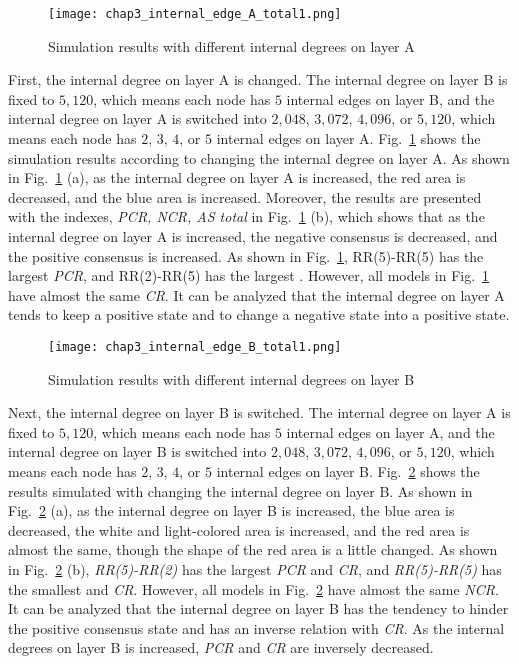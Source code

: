 \begin{figure}[!htb]
	\centering
	\texttt{[image: chap3\_internal\_edge\_A\_total1.png]}
	\caption{Simulation results with different internal degrees on layer A}
	\label{chap3_internal_edge_A_total}
\end{figure}

First, the internal degree on layer A is changed. The internal degree on layer B is fixed to $5,120$, which means each node has $5$ internal edges on layer B, and the internal degree on layer A is switched into $2,048$, $3,072$, $4,096$, or $5,120$, which means each node has $2$, $3$, $4$, or $5$ internal edges on layer A. Fig.~\ref{chap3_internal_edge_A_total} shows the simulation results according to changing the internal degree on layer A. As shown in Fig.~\ref{chap3_internal_edge_A_total} (a), as the internal degree on layer A is increased, the red area is decreased, and the blue area is increased. Moreover, the results are presented with the indexes, \textit{PCR, NCR, AS total} in Fig.~\ref{chap3_internal_edge_A_total} (b), which shows that as the internal degree on layer A is increased, the negative consensus is decreased, and the positive consensus is increased. As shown in Fig.~\ref{chap3_internal_edge_A_total}, RR(5)-RR(5) has the largest \textit{PCR}, and RR(2)-RR(5) has the largest . However, all models in Fig.~\ref{chap3_internal_edge_A_total} have almost the same \textit{CR}. It can be analyzed that the internal degree on layer A tends to keep a positive state and to change a negative state into a positive state. 

\begin{figure}[!htb]
	\centering
	\texttt{[image: chap3\_internal\_edge\_B\_total1.png]}
	\caption{Simulation results with different internal degrees on layer B}
	\label{chap3_internal_edge_B_total}
\end{figure}

Next, the internal degree on layer B is switched. The internal degree on layer A is fixed to  $5,120$, which means each node has $5$ internal edges on layer A, and the internal degree on layer B is switched into $2,048$, $3,072$, $4,096$, or $5,120$, which means each node has $2$, $3$, $4$, or $5$ internal edges on layer B. Fig.~\ref{chap3_internal_edge_B_total} shows the results simulated with changing the internal degree on layer B. As shown in Fig.~\ref{chap3_internal_edge_B_total} (a), as the internal degree on layer B is increased, the blue area is decreased, the white and light-colored area is increased, and the red area is almost the same, though the shape of the red area is a little changed.  As shown in Fig.~\ref{chap3_internal_edge_B_total} (b), \textit{RR(5)-RR(2)} has the largest \textit{PCR} and \textit{CR}, and \textit{RR(5)-RR(5)} has the smallest  and \textit{CR}. However, all models in Fig.~\ref{chap3_internal_edge_B_total} have almost the same \textit{NCR}. It can be analyzed that the internal degree on layer B has the tendency to hinder the positive consensus state and has an inverse relation with \textit{CR}. As the internal degrees on layer B is increased, \textit{PCR} and \textit{CR} are inversely decreased.

